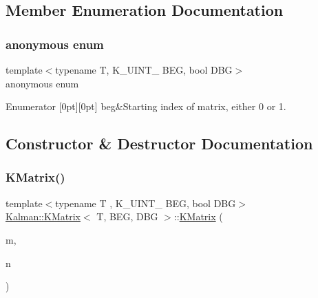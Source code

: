 \subsection{Member Enumeration Documentation}
\mbox{\label{classKalman_1_1KMatrix_a15a7efc1ab21c4f96c5cad6cd8349339}} 
\subsubsection{\texorpdfstring{anonymous enum}{anonymous enum}}
{\footnotesize\ttfamily template$<$typename T, K\+\_\+\+U\+I\+N\+T\+\_ B\+EG, bool D\+BG$>$ \\
anonymous enum}

\begin{DoxyEnumFields}{Enumerator}
[0pt][0pt]{}\mbox{\label{classKalman_1_1KMatrix_a15a7efc1ab21c4f96c5cad6cd8349339a59bda0c9d147b1f66955188d5586994f}} 
beg&Starting index of matrix, either 0 or 1. \\
\hline

\end{DoxyEnumFields}


\subsection{Constructor \& Destructor Documentation}
\mbox{\label{classKalman_1_1KMatrix_aa8c4f382fc7b555f759b715a3f8bd4ae}} 
\subsubsection{\texorpdfstring{K\+Matrix()}{KMatrix()}\hspace{0.1cm}{\footnotesize\ttfamily [1/4]}}
{\footnotesize\ttfamily template$<$typename T , K\+\_\+\+U\+I\+N\+T\+\_ B\+EG, bool D\+BG$>$ \\
\mbox{\hyperlink{classKalman_1_1KMatrix}{Kalman\+::\+K\+Matrix}}$<$ T, B\+EG, D\+BG $>$\+::\mbox{\hyperlink{classKalman_1_1KMatrix}{K\+Matrix}} (\begin{DoxyParamCaption}\item[{\mbox{\hyperlink{namespaceKalman_a628a50cae10f6e2035393d4f96c698bd}{K\+\_\+\+U\+I\+N\+T\+\_\+32}}}]{m,  }\item[{\mbox{\hyperlink{namespaceKalman_a628a50cae10f6e2035393d4f96c698bd}{K\+\_\+\+U\+I\+N\+T\+\_\+32}}}]{n }\end{DoxyParamCaption})\hspace{0.3cm}{\ttfamily [inline]}}




